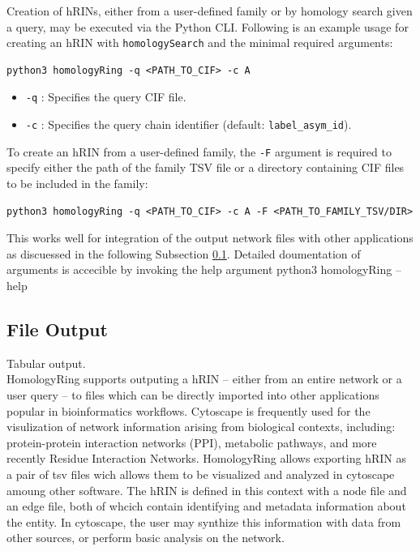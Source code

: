 Creation of hRINs, either from a user-defined family or by homology search given a query, may be executed via the Python CLI. 
Following is an example usage for creating an hRIN with \texttt{homologySearch} and the minimal required arguments:

\begin{verbatim}
python3 homologyRing -q <PATH_TO_CIF> -c A
\end{verbatim}

\begin{itemize}
    \item \texttt{-q} : Specifies the query CIF file.
    \item \texttt{-c} : Specifies the query chain identifier (default: \texttt{label\_asym\_id}).
\end{itemize}

To create an hRIN from a user-defined family, the \texttt{-F} argument is required to specify either the path of the family TSV file or a directory containing CIF files to be included in the family:

\begin{verbatim}
python3 homologyRing -q <PATH_TO_CIF> -c A -F <PATH_TO_FAMILY_TSV/DIR>
\end{verbatim}
This works well for integration of the output network files with other applications as discuessed in the following Subsection \ref{subsec:file-out}. 
Detailed doumentation of arguments is accecible by invoking the help argument
python3 homologyRing --help

\subsection{File Output}
\label{subsec:file-out}
Tabular output.\\
HomologyRing supports outputing a hRIN -- either from an entire network or a user query -- to files which can be directly imported into other applications popular in bioinformatics workflows. 
Cytoscape is frequently used for the visulization of network information arising from biological contexts, including: protein-protein interaction networks (PPI), metabolic pathways, and more recently Residue Interaction Networks. HomologyRing allows exporting hRIN as a pair of tsv files wich allows them to be visualized and analyzed in cytoscape amoung other software. The hRIN is defined in this context with a node file and an edge file, both of whcich contain identifying and metadata information about the entity. In cytoscape, the user may synthize this information with data from other sources, or perform basic analysis on the network.

